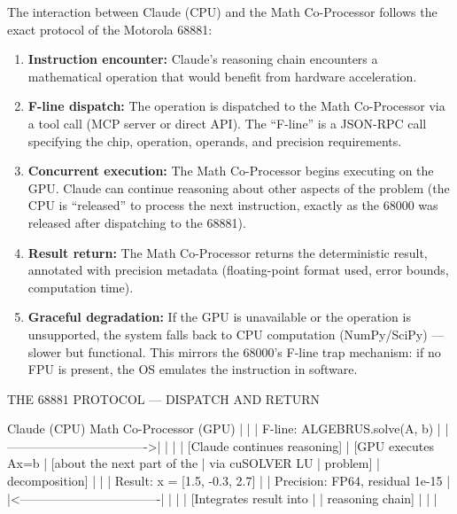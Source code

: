 \documentclass[11pt,letterpaper]{article}
\begin{document}
The interaction between Claude (CPU) and the Math Co-Processor follows the exact protocol of the Motorola 68881:

\begin{enumerate}[leftmargin=2em]
\item \textbf{Instruction encounter:} Claude's reasoning chain encounters a mathematical operation that would benefit from hardware acceleration.

\item \textbf{F-line dispatch:} The operation is dispatched to the Math Co-Processor via a tool call (MCP server or direct API). The ``F-line'' is a JSON-RPC call specifying the chip, operation, operands, and precision requirements.

\item \textbf{Concurrent execution:} The Math Co-Processor begins executing on the GPU. Claude can continue reasoning about other aspects of the problem (the CPU is ``released'' to process the next instruction, exactly as the 68000 was released after dispatching to the 68881).

\item \textbf{Result return:} The Math Co-Processor returns the deterministic result, annotated with precision metadata (floating-point format used, error bounds, computation time).

\item \textbf{Graceful degradation:} If the GPU is unavailable or the operation is unsupported, the system falls back to CPU computation (NumPy/SciPy) --- slower but functional. This mirrors the 68000's F-line trap mechanism: if no FPU is present, the OS emulates the instruction in software.
\end{enumerate}

\begin{asciibox}
THE 68881 PROTOCOL — DISPATCH AND RETURN

  Claude (CPU)                    Math Co-Processor (GPU)
      |                                   |
      |  F-line: ALGEBRUS.solve(A, b)     |
      |---------------------------------->|
      |                                   |
      |  [Claude continues reasoning]     | [GPU executes Ax=b
      |  [about the next part of the      |  via cuSOLVER LU
      |   problem]                        |  decomposition]
      |                                   |
      |  Result: x = [1.5, -0.3, 2.7]    |
      |  Precision: FP64, residual 1e-15  |
      |<----------------------------------|
      |                                   |
      |  [Integrates result into          |
      |   reasoning chain]                |
      |                                   |
\end{asciibox}
\end{document}
